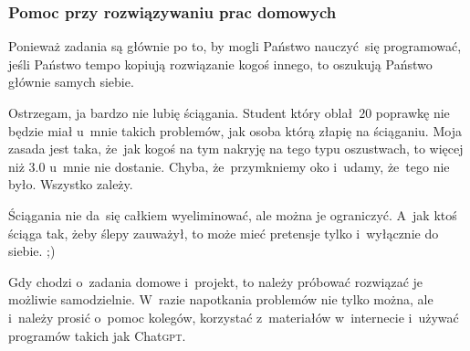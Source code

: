 \documentclass[10pt,t]{beamer}
\begin{document}
\begin{frame}
  \frametitle{Pomoc przy rozwiązywaniu prac domowych}





  Ponieważ zadania są głównie po to, by mogli Państwo nauczyć~się
  programować, jeśli Państwo tempo kopiują rozwiązanie kogoś innego,
  to oszukują Państwo głównie samych siebie.

  Ostrzegam, ja bardzo \alert{nie lubię} ściągania. Student który
  oblał~$20$ poprawkę nie będzie miał u~mnie takich problemów, jak osoba
  którą złapię na ściąganiu. Moja zasada jest taka, że~jak kogoś na tym
  nakryję na tego typu oszustwach, to więcej niż $3.0$ u~mnie
  \alert{nie dostanie}. Chyba, że~przymkniemy oko i~udamy, że~tego nie było.
  Wszystko zależy.

  Ściągania nie da~się całkiem wyeliminować, ale można je ograniczyć.
  A~jak ktoś ściąga tak, żeby ślepy zauważył, to może mieć pretensje tylko
  i~wyłącznie do siebie. ;)

  Gdy chodzi o~zadania domowe i~projekt, to należy próbować rozwiązać je
  możliwie samodzielnie. W~razie napotkania problemów nie tylko można,
  ale i~należy prosić o~pomoc kolegów, korzystać z~materiałów w~internecie
  i~używać programów takich jak Chat\textsc{gpt}.



\end{frame}
\end{document}
